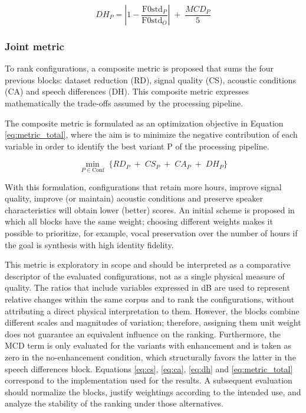 \begin{equation}
\label{eq:dh}
DH_P =
\left|1 - \frac{\mathrm{F0std}_P}{\mathrm{F0std}_O}\right|
\;+\; \frac{MCD_P}{5}
\end{equation}

\subsubsection{Joint metric}
\label{sec:metrica-conjunta}
To rank configurations, a composite metric is proposed that sums the four previous blocks: dataset reduction (RD), signal quality (CS), acoustic conditions (CA) and speech differences (DH). This composite metric expresses mathematically the trade-offs assumed by the processing pipeline.

The composite metric is formulated as an optimization objective in Equation \ref{eq:metric_total}, where the aim is to minimize the negative contribution of each variable in order to identify the best variant P of the processing pipeline.

\begin{equation}
\label{eq:metric_total}
\min_{P \in \mathrm{Conf}}\;
\Big\{
RD_{P}
\;+\;
CS_{P}
\;+\;
CA_{P}
\;+\;
DH_{P}
\Big\}
\end{equation}

With this formulation, configurations that retain more hours, improve signal quality, improve (or maintain) acoustic conditions and preserve speaker characteristics will obtain lower (better) scores. An initial scheme is proposed in which all blocks have the same weight; choosing different weights makes it possible to prioritize, for example, vocal preservation over the number of hours if the goal is synthesis with high identity fidelity.

This metric is exploratory in scope and should be interpreted as a comparative descriptor of the evaluated configurations, not as a single physical measure of quality. The ratios that include variables expressed in dB are used to represent relative changes within the same corpus and to rank the configurations, without attributing a direct physical interpretation to them. However, the blocks combine different scales and magnitudes of variation; therefore, assigning them unit weight does not guarantee an equivalent influence on the ranking. Furthermore, the MCD term is only evaluated for the variants with enhancement and is taken as zero in the no-enhancement condition, which structurally favors the latter in the speech differences block. Equations \ref{eq:cs}, \ref{eq:ca}, \ref{eq:dh} and \ref{eq:metric_total} correspond to the implementation used for the results. A subsequent evaluation should normalize the blocks, justify weightings according to the intended use, and analyze the stability of the ranking under those alternatives.

